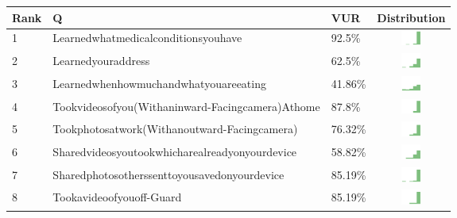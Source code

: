 \begin{table}[t]
\begin{center}
\small
\begin{tabular}{| p{0.5cm} | p{7cm} | p{1cm} | c |}
\hline
 Rank & Q &  VUR & Distribution  \\ 
\hline
1 & Learnedwhatmedicalconditionsyouhave & 92.5\% & \includegraphics[width = 2cm, height = 0.5cm]{../learnedwhatmedicalconditionsyouhaveFRIENDS} \\ \hline 
2 & Learnedyouraddress & 62.5\% & \includegraphics[width = 2cm, height = 0.5cm]{../learnedyouraddressFRIENDS} \\ \hline 
3 & Learnedwhenhowmuchandwhatyouareeating & 41.86\% & \includegraphics[width = 2cm, height = 0.5cm]{../learnedwhenhowmuchandwhatyouareeatingFRIENDS} \\ \hline 
4 & Tookvideosofyou(Withaninward-Facingcamera)Athome & 87.8\% & \includegraphics[width = 2cm, height = 0.5cm]{../tookvideosofyou(withaninward-facingcamera)athomeFRIENDS} \\ \hline 
5 & Tookphotosatwork(Withanoutward-Facingcamera) & 76.32\% & \includegraphics[width = 2cm, height = 0.5cm]{../tookphotosatwork(withanoutward-facingcamera)FRIENDS} \\ \hline 
6 & Sharedvideosyoutookwhicharealreadyonyourdevice & 58.82\% & \includegraphics[width = 2cm, height = 0.5cm]{../sharedvideosyoutookwhicharealreadyonyourdeviceFRIENDS} \\ \hline 
7 & Sharedphotosotherssenttoyousavedonyourdevice & 85.19\% & \includegraphics[width = 2cm, height = 0.5cm]{../sharedphotosotherssenttoyousavedonyourdeviceFRIENDS} \\ \hline 
8 & Tookavideoofyouoff-Guard & 85.19\% & \includegraphics[width = 2cm, height = 0.5cm]{../tookavideoofyouoff-guardFRIENDS} \\ \hline 

\end{tabular}
\end{center}
\end{table}
